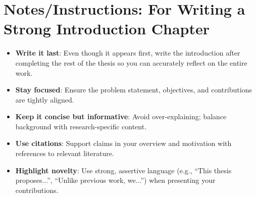 \vspace{0.2cm}
\section*{Notes/Instructions: For Writing a Strong Introduction Chapter}
\begin{itemize}
    \item \textbf{Write it last}: Even though it appears first, write the introduction after completing the rest of the thesis so you can accurately reflect on the entire work.
    \item \textbf{Stay focused}: Ensure the problem statement, objectives, and contributions are tightly aligned.
    \item \textbf{Keep it concise but informative}: Avoid over-explaining; balance background with research-specific content.
    \item \textbf{Use citations}: Support claims in your overview and motivation with references to relevant literature.
    \item \textbf{Highlight novelty}: Use strong, assertive language (e.g., ``This thesis proposes...'', ``Unlike previous work, we...'') when presenting your contributions.
\end{itemize}
